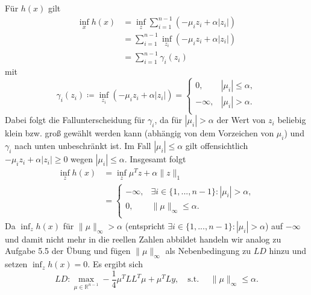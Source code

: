\documentclass[ngerman, a4paper,12pt]{article}
\begin{document}
Für $h(x)$ gilt
\begin{equation*}
	\begin{split}
		\inf_x h(x)&=\inf_z \sum_{i=1}^{n-1}( -\mu_iz_i+\alpha|z_i|) \\
		  &= \sum_{i=1}^{n-1} \inf_{z_i} (-\mu_iz_i+\alpha|z_i|) \\
		  &= \sum_{i=1}^{n-1} \gamma_i (z_i)
		  \end{split}
\end{equation*}
mit 
\begin{equation*}
\gamma_i(z_i) \coloneqq \inf_{z_i}(-\mu_iz_i + \alpha |z_i|)= \begin{cases}
	0,& |\mu_i|\leq \alpha,\\
	-\infty,& |\mu_i|>\alpha.\\
\end{cases}
\end{equation*}
Dabei folgt die Fallunterscheidung für $\gamma_i$, da für $|\mu_i|>\alpha$ der Wert von $z_i$ beliebig klein bzw. groß gewählt werden kann (abhängig von dem Vorzeichen von $\mu_i$) und $\gamma_i$ nach unten unbeschränkt ist. Im Fall $|\mu_i|\leq \alpha$ gilt offensichtlich $-\mu_iz_i +\alpha|z_i| \geq 0$ wegen $|\mu_i| \leq \alpha$.
Insgesamt folgt 
\begin{equation*}
	\begin{split}
		\inf_z h(x) &=  \inf_{z} \mu^Tz+\alpha\|z\|_1 \\
		&=\begin{cases}
		-\infty,&\exists i \in \{1,..., n-1\}:|\mu_i | >\alpha,\\
		0,&\|\mu\|_\infty\leq\alpha.\\
		\end{cases}
	\end{split}
\end{equation*}
Da $\inf_z h(x)$ für $\| \mu \|_{\infty} > \alpha $ (entspricht $\exists i \in \{1,..., n-1\}:|\mu_i | >\alpha$) auf $-\infty$ und damit nicht mehr in die reellen Zahlen abbildet handeln wir analog zu Aufgabe 5.5 der Übung und fügen $\| \mu \|_{\infty}$ als Nebenbedingung zu $LD$ hinzu und setzen $\inf_z h(x)=0$. Es ergibt sich
\begin{equation*}
  LD:  \max_{\mu \in \mathbb{R}^{n-1}} -\frac{1}{4}\mu^TLL^T\mu + \mu^TLy,\quad \text{s.t. } \quad \|\mu\|_\infty\leq\alpha.
\end{equation*}
\end{document}
